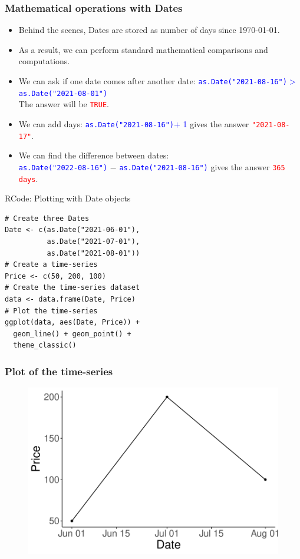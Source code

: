 \documentclass{beamer}
\begin{document}
\begin{frame}\frametitle{Mathematical operations with Dates}
\begin{itemize}
\item Behind the scenes, Dates are stored as number of days since 1970-01-01.
\vspace{0.15in}
\item<2-> As a result, we can perform standard mathematical comparisons and computations.
\vspace{0.15in}
\item<3-> We can ask if one date comes after another date: \textcolor{blue}{\texttt{as.Date("2021-08-16")}$>$\texttt{as.Date("2021-08-01")}}\\ The answer will be \texttt{\textcolor{red}{TRUE}}.
\vspace{0.15in}
\item<4-> We can add days:
\textcolor{blue}{\texttt{as.Date("2021-08-16")}$+$ 1} gives the answer \textcolor{red}{\texttt{"2021-08-17"}}.
\vspace{0.10in}
\item<5-> We can find the difference between dates:\\
\textcolor{blue}{\texttt{as.Date("2022-08-16")}} $ - $ \textcolor{blue}{\texttt{as.Date("2021-08-16")}} gives the answer \texttt{\textcolor{red}{365 days}}.
\end{itemize}
\end{frame}

\begin{frame}[fragile]{RCode: Plotting with Date objects}
\begin{lstlisting}
# Create three Dates
Date <- c(as.Date("2021-06-01"), 
          as.Date("2021-07-01"), 
          as.Date("2021-08-01"))
# Create a time-series
Price <- c(50, 200, 100)
# Create the time-series dataset
data <- data.frame(Date, Price)
# Plot the time-series
ggplot(data, aes(Date, Price)) + 
  geom_line() + geom_point() + 
  theme_classic()
\end{lstlisting}
\end{frame}

\begin{frame}\frametitle{Plot of the time-series}
\begin{figure}
\includegraphics[width=0.99\linewidth]{PlotsLec4/TimeSeries}
\end{figure}
\end{frame}
\end{document}
